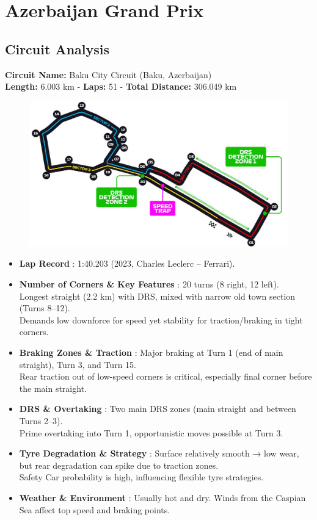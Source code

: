 \section{Azerbaijan Grand Prix}

\subsection{Circuit Analysis}

\textbf{Circuit Name:} Baku City Circuit (Baku, Azerbaijan) \\
\textbf{Length:} 6.003 km - \textbf{Laps:} 51 - \textbf{Total Distance:} 306.049 km

\begin{figure}[H]
    \centering
    \includegraphics[width=0.75\linewidth]{images/17.Azerbaijan_Circuit.jpg}
\end{figure}

\begin{itemize}
    \item \textbf{Lap Record} : 1:40.203 (2023, Charles Leclerc – Ferrari).

    \item \textbf{Number of Corners \& Key Features} : 20 turns (8 right, 12 left). \\
    Longest straight (2.2 km) with DRS, mixed with narrow old town section (Turns 8–12). \\
    Demands low downforce for speed yet stability for traction/braking in tight corners.

    \item \textbf{Braking Zones \& Traction} : Major braking at Turn 1 (end of main straight), Turn 3, and Turn 15. \\
    Rear traction out of low-speed corners is critical, especially final corner before the main straight.

    \item \textbf{DRS \& Overtaking} : Two main DRS zones (main straight and between Turns 2–3). \\
    Prime overtaking into Turn 1, opportunistic moves possible at Turn 3.

    \item \textbf{Tyre Degradation \& Strategy} : Surface relatively smooth → low wear, but rear degradation can spike due to traction zones. \\
    Safety Car probability is high, influencing flexible tyre strategies.

    \item \textbf{Weather \& Environment} : Usually hot and dry. Winds from the Caspian Sea affect top speed and braking points.
\end{itemize}

